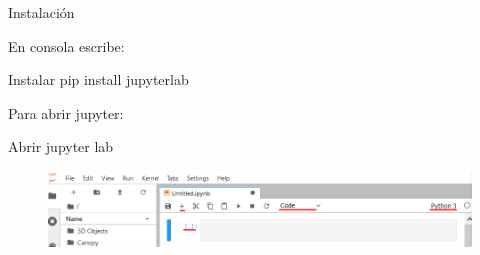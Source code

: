 \begin{frame}[t]{Instalaci\'on}\vspace{10pt}

En consola escribe:

\begin{block}{Instalar}
	pip install jupyterlab
\end{block}

Para abrir jupyter:

\begin{block}{Abrir}
	jupyter lab
\end{block}

\begin{figure}
	\includegraphics[scale=0.5]{Images/Herramientas.PNG}
\end{figure}

\end{frame}